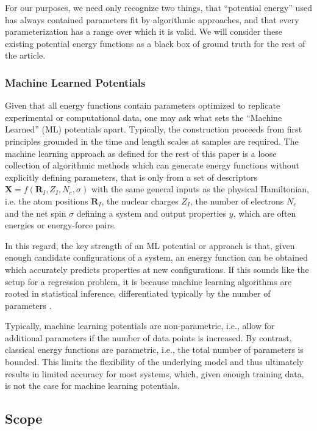 \documentclass[9pt,bestpractices]{livecoms}
\begin{document}
For our purposes, we need only recognize two things, that ``potential energy''
used has always contained parameters fit by algorithmic approaches, and that
every parameterization has a range over which it is valid. We will consider
these existing potential energy functions as a black box of ground truth for the
rest of the article.

\subsubsection{Machine Learned Potentials}
Given that all energy functions contain parameters optimized to replicate
experimental or computational data, one may ask what sets the ``Machine Learned'' (ML) potentials
apart. Typically, the construction proceeds from first principles grounded in
the time and length scales at samples are required. The machine learning
approach as defined for the rest of this paper is a loose collection of
algorithmic methods \cite{ceriottiUnsupervisedMachineLearning2019} which can
generate energy functions without explicitly defining parameters, that is only
from a set of descriptors $\mathbf{X}=f(\mathbf{R}_I, Z_I, N_e, \sigma)$ with the same general inputs as the physical Hamiltonian, i.e. the atom positions $\mathbf{R}_I$, the nuclear charges $Z_I$, the number of electrons $N_e$ and the net spin $\sigma$ defining a system and output
properties $y$, which are often energies or energy-force pairs.

In this regard, the key strength of an ML potential or approach is that, given
enough candidate configurations of a system, an energy function can be obtained
which accurately predicts properties at new configurations. If this sounds like
the setup for a regression problem, it is because machine learning algorithms
are rooted in statistical inference, differentiated typically by the number of
parameters \cite{efronComputerAgeStatistical}.

Typically, machine learning potentials are non-parametric, i.e., allow for additional parameters if the number of data points is increased. By contrast, classical energy functions are parametric, i.e., the total number of parameters is bounded. This limits the flexibility of the underlying model and thus ultimately results in limited accuracy for most systems, which, given enough training data, is not the case for machine learning potentials.

\subsection{Scope}
\end{document}
